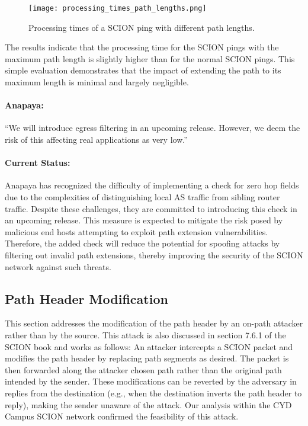 \begin{figure}[H]
    \centering
    \texttt{[image: processing\_times\_path\_lengths.png]}
    \caption{Processing times of a SCION ping with different path lengths.}
    \label{fig:path_extension}
\end{figure}

The results indicate that the processing time for the SCION pings with the maximum path length is slightly higher than for the normal SCION pings.
This simple evaluation demonstrates that the impact of extending the path to its maximum length is minimal and largely negligible.

\begin{boxH}
\paragraph{Anapaya:}
``We will introduce egress filtering in an upcoming release.
However, we deem the risk of this affecting real applications as very low.''
\end{boxH}

\paragraph{Current Status:}
Anapaya has recognized the difficulty of implementing a check for zero hop fields due to the complexities of distinguishing local AS traffic from sibling router traffic.
Despite these challenges, they are committed to introducing this check in an upcoming release.
This measure is expected to mitigate the risk posed by malicious end hosts attempting to exploit path extension vulnerabilities.
Therefore, the added check will reduce the potential for spoofing attacks by filtering out invalid path extensions, thereby improving the security of the SCION network against such threats.

\subsection{Path Header Modification}
\label{sec:path-header-modification}
This section addresses the modification of the path header by an on-path attacker rather than by the source.
This attack is also discussed in section 7.6.1 of the SCION book \cite{Perrig2022} and works as follows:
An attacker intercepts a SCION packet and modifies the path header by replacing path segments as desired.
The packet is then forwarded along the attacker chosen path rather than the original path intended by the sender.
These modifications can be reverted by the adversary in replies from the destination (e.g., when the destination inverts the path header to reply), making the sender unaware of the attack.
Our analysis within the CYD Campus SCION network confirmed the feasibility of this attack.

